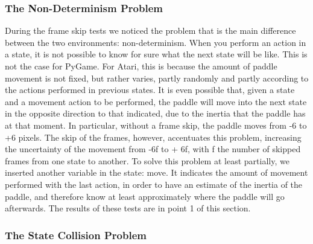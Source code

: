 \subsubsection{The Non-Determinism Problem}

During the frame skip tests we noticed the problem that is the main difference between the two environments: non-determinism. When you perform an action in a state, it is not possible to know for sure what the next state will be like. This is not the case for PyGame. For Atari, this is because the amount of paddle movement is not fixed, but rather varies, partly randomly and partly according to the actions performed in previous states. It is even possible that, given a state and a movement action to be performed, the paddle will move into the next state in the opposite direction to that indicated, due to the inertia that the paddle has at that moment. In particular, without a frame skip, the paddle moves from -6 to +6 pixels. The skip of the frames, however, accentuates this problem, increasing the uncertainty of the movement from -6f to + 6f, with f the number of skipped frames from one state to another. To solve this problem at least partially, we inserted another variable in the state: move. It indicates the amount of movement performed with the last action, in order to have an estimate of the inertia of the paddle, and therefore know at least approximately where the paddle will go afterwards. The results of these tests are in point 1 of this section.

\subsubsection{The State Collision Problem}


